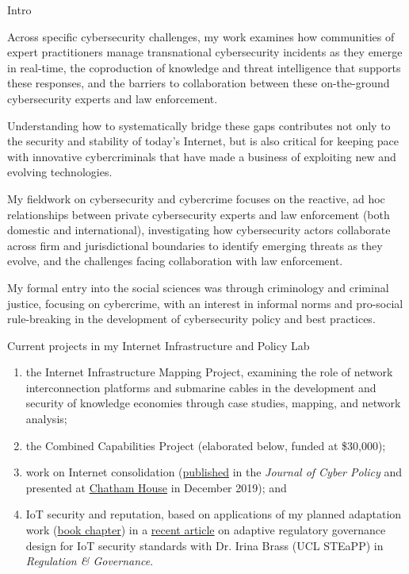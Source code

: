 

Intro


Across specific cybersecurity challenges, my work examines how communities of expert practitioners manage transnational cybersecurity incidents as they emerge in real-time, the coproduction of knowledge and threat intelligence that supports these responses, and the barriers to collaboration between these on-the-ground cybersecurity experts and law enforcement.


%
Understanding how to systematically bridge these gaps contributes not only to the security and stability of today's Internet, but is also critical for keeping pace with innovative cybercriminals that have made a business of exploiting new and evolving technologies. 


My fieldwork on cybersecurity and cybercrime focuses on the reactive, ad hoc relationships between private cybersecurity experts and law enforcement (both domestic and international), investigating how cybersecurity actors collaborate across firm and jurisdictional boundaries to identify emerging threats as they evolve, and the challenges facing collaboration with law enforcement.



My formal entry into the social sciences was through criminology and criminal justice, focusing on cybercrime, with an interest in informal norms and pro-social rule-breaking in the development of cybersecurity policy and best practices.



Current projects in my Internet Infrastructure and Policy Lab 
%
\begin{enumerate}
  \item the Internet Infrastructure Mapping Project, examining the role of network interconnection platforms and submarine cables in the development and security of knowledge economies through case studies, mapping, and network analysis; 
  \item the Combined Capabilities Project (elaborated below, funded at \$30,000); 
  \item work on Internet consolidation (\href{https://www.tandfonline.com/doi/full/10.1080/23738871.2020.1754443}{published} in the \emph{Journal of Cyber Policy} and presented at \href{https://www.chathamhouse.org/2019/12/internet-consolidation-what-lies-beneath-application-layer}{Chatham House} in December 2019); and 
  \item IoT security and reputation, based on applications of my planned adaptation work (\href{https://link.springer.com/chapter/10.1007/978-3-030-05252-2_13}{book chapter}) in a \href{https://onlinelibrary.wiley.com/doi/full/10.1111/rego.12343}{recent article} on adaptive regulatory governance design for IoT security standards with Dr. Irina Brass (UCL STEaPP) in \emph{Regulation \& Governance}.
\end{enumerate}%



